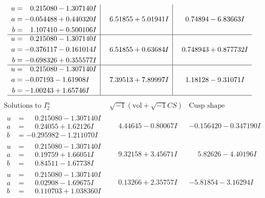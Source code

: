 \documentclass[1p]{elsarticle_modified}
\theoremstyle{definition}
\newcommand{\I}{\sqrt{-1}}
\begin{document}
$$\begin{array}{c|c|c}
\begin{aligned}
u &= \phantom{-}0.215080 - 1.307140 I \\
a &= -0.054488 + 0.440320 I \\
b &= \phantom{-}1.107410 - 0.500106 I\end{aligned}
 & \phantom{-}6.51855 + 5.01941 I & \phantom{-}0.74894 - 6.83663 I \\ \hline\begin{aligned}
u &= \phantom{-}0.215080 - 1.307140 I \\
a &= -0.376117 - 0.161014 I \\
b &= -0.698326 + 0.355577 I\end{aligned}
 & \phantom{-}6.51855 + 0.63684 I & \phantom{-}0.748943 + 0.877732 I \\ \hline\begin{aligned}
u &= \phantom{-}0.215080 - 1.307140 I \\
a &= -0.07193 - 1.61908 I \\
b &= -1.00243 + 1.65746 I\end{aligned}
 & \phantom{-}7.39513 + 7.89997 I & \phantom{-}1.18128 - 9.31071 I\\
 \hline 
 \end{array}$$\newpage$$\begin{array}{c|c|c}  
\text{Solutions to }I^u_{2}& \I (\text{vol} + \sqrt{-1}CS) & \text{Cusp shape}\\
 \hline 
\begin{aligned}
u &= \phantom{-}0.215080 - 1.307140 I \\
a &= \phantom{-}0.24055 + 1.62126 I \\
b &= -0.295982 - 1.211070 I\end{aligned}
 & \phantom{-}4.44645 - 0.80067 I & -0.156420 - 0.347190 I \\ \hline\begin{aligned}
u &= \phantom{-}0.215080 - 1.307140 I \\
a &= \phantom{-}0.19759 + 1.66051 I \\
b &= \phantom{-}0.84511 - 1.67738 I\end{aligned}
 & \phantom{-}9.32158 + 3.45671 I & \phantom{-}5.82626 - 4.40196 I \\ \hline\begin{aligned}
u &= \phantom{-}0.215080 - 1.307140 I \\
a &= \phantom{-}0.02908 - 1.69675 I \\
b &= \phantom{-}0.110703 + 1.038360 I\end{aligned}
 & \phantom{-}0.13266 + 2.35757 I & -5.81854 - 3.16294 I \\ \hline\begin{aligned}

\end{aligned}
\end{array}$$
\end{document}
